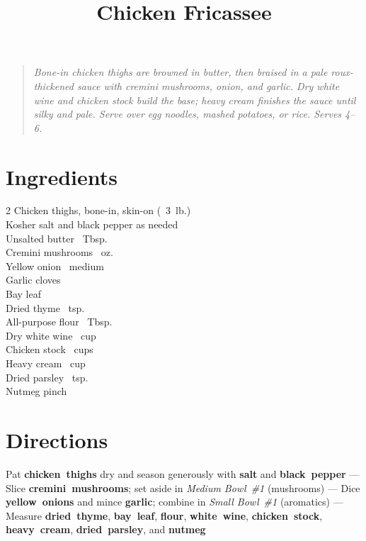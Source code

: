\documentclass[11pt,letterpaper]{article}
\title{Chicken Fricassee}
\author{}
\date{}
\begin{document}
\maketitle
\thispagestyle{empty}

\begin{quote}\textit{Bone-in chicken thighs are browned in butter, then braised in a pale roux-thickened sauce with cremini mushrooms, onion, and garlic. Dry white wine and chicken stock build the base; heavy cream finishes the sauce until silky and pale. Serve over egg noodles, mashed potatoes, or rice. Serves 4--6.}\end{quote}

\section*{Ingredients}
\setlength{\columnsep}{20pt}
\begin{multicols}{2}
\noindent
    Chicken thighs, bone-in, skin-on  (~3~lb.) \\
    Kosher salt and black pepper \dotfill as needed \\
    Unsalted butter ~Tbsp. \\
    Cremini mushrooms ~oz. \\
    Yellow onion ~medium \\
    Garlic cloves  \\
    Bay leaf  \\
    Dried thyme ~tsp. \\
    All-purpose flour ~Tbsp. \\
    Dry white wine \dotfill {}~cup \\
    Chicken stock ~cups \\
    Heavy cream \dotfill {}~cup \\
    Dried parsley ~tsp. \\
    Nutmeg \dotfill pinch \\
\end{multicols}

\section*{Directions}

\noindent
Pat \textbf{chicken~thighs} dry and season generously with \textbf{salt} and \textbf{black~pepper} ---
Slice \textbf{cremini~mushrooms}; set aside in \textit{Medium Bowl~\#1} (mushrooms) ---
Dice \textbf{yellow~onions} and mince \textbf{garlic}; combine in \textit{Small Bowl~\#1} (aromatics) ---
Measure \textbf{dried~thyme}, \textbf{bay~leaf}, \textbf{flour}, \textbf{white~wine}, \textbf{chicken~stock}, \textbf{heavy~cream}, \textbf{dried~parsley}, and \textbf{nutmeg}
\end{document}
